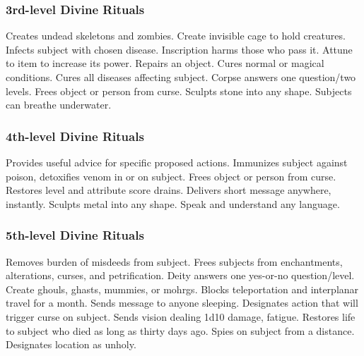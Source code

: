 \subsubsection{3rd-level Divine Rituals}
\begin{rituallist}
     Creates undead skeletons and zombies.
     Create invisible cage to hold creatures.
     Infects subject with chosen disease.
    \M Inscription harms those who pass it.
     Attune to item to increase its power.
     Repairs an object.
     Cures normal or magical conditions.
     Cures all diseases affecting subject.
     Corpse answers one question/two levels.
     Frees object or person from curse.
     Sculpts stone into any shape.
     Subjects can breathe underwater.
\end{rituallist}

\subsubsection{4th-level Divine Rituals}
\begin{rituallist}
     Provides useful advice for specific proposed actions.
     Immunizes subject against poison, detoxifies venom in or on subject.
     Frees object or person from curse.
     Restores level and attribute score drains.
     Delivers short message anywhere, instantly.
     Sculpts metal into any shape.
     Speak and understand any language.
\end{rituallist}

\subsubsection{5th-level Divine Rituals}
\begin{rituallist}
    \F\M Removes burden of misdeeds from subject.
     Frees subjects from enchantments, alterations, curses, and petrification.
     Deity answers one yes-or-no question/level.
     Create ghouls, ghasts, mummies, or mohrgs.
     Blocks teleportation and interplanar travel for a month.
     Sends message to anyone sleeping.
     Designates action that will trigger curse on subject.
     Sends vision dealing 1d10 damage, fatigue.
     Restores life to subject who died as long as thirty days ago.
    \F Spies on subject from a distance.
     Designates location as unholy.
\end{rituallist}

